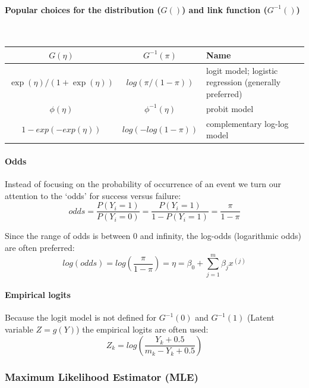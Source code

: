 \paragraph{Popular choices for the distribution ($G()$) and link function ($G^{-1}()$)}\mbox{}\\
\begin{tabular}{ccl}
	\hline 
	$G(\eta)$ & $G^{-1}(\pi)$ & Name \\ 
	\hline 
	$\exp(\eta)/(1+\exp(\eta))$& $log(\pi/(1-\pi))$  & logit model; logistic regression (generally preferred) \\ 
	$\phi(\eta)$ & $\phi^{-1}(\eta)$ & probit model \\
	$1-exp(-exp(\eta))$ & $log(-log(1-\pi))$ & complementary log-log model \\
	\hline 
\end{tabular}

\paragraph{Odds}
Instead of focusing on the probability of occurrence of an event we turn our attention to the ‘odds’ for success versus failure:
\begin{equation*}
odds = \frac{P(Y_i=1)}{P(Y_i=0)} = \frac{P(Y_i=1)}{1 - P(Y_i=1)} = \frac{\pi}{1-\pi}
\end{equation*}

Since the range of odds is between 0 and infinity, the log-odds (logarithmic odds) are often preferred:
\begin{equation*}
log(odds) = log(\frac{\pi}{1-\pi}) = \eta = \beta_0 + \sum_{j=1}^{m} \beta_j x^{(j)}
\end{equation*}

\paragraph{Empirical logits}

Because the logit model is not defined for $G^{-1}(0)$ and $G^{-1}(1)$ (Latent variable $Z = g(Y)$) the empirical logits are often used:
\begin{equation*}
Z_k = log(\frac{Y_k + 0.5}{m_k-Y_k+0.5})
\end{equation*}

\subsubsection{Maximum Likelihood Estimator (MLE)}

